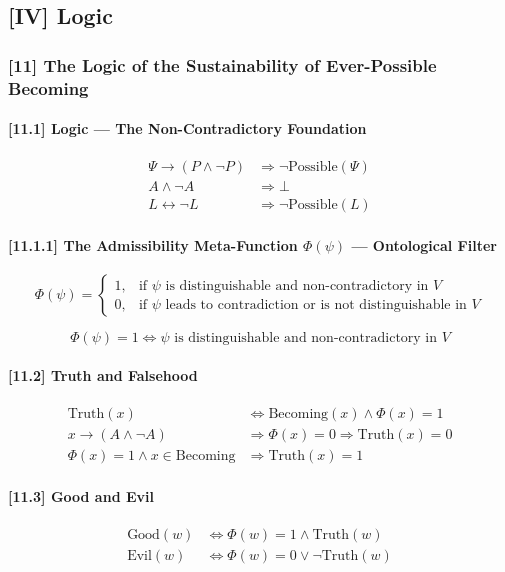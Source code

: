 \documentclass[12pt]{article}
\begin{document}
\subsection*{[IV] Logic}

\subsubsection*{[11] The Logic of the Sustainability of Ever-Possible Becoming}

\paragraph{[11.1] Logic — The Non-Contradictory Foundation}
\begin{align*}
\Psi \to (P \land \neg P) &\Rightarrow \neg\mathrm{Possible}(\Psi) \\
A \land \neg A &\Rightarrow \bot \\
L \leftrightarrow \neg L &\Rightarrow \neg\mathrm{Possible}(L)
\end{align*}

\paragraph{[11.1.1] The Admissibility Meta-Function $\Phi(\psi)$ — Ontological Filter}
\[
\Phi(\psi) =
\begin{cases}
1, & \text{if } \psi \text{ is distinguishable and non-contradictory in } V \\[4pt]
0, & \text{if } \psi \text{ leads to contradiction or is not distinguishable in } V
\end{cases}
\]

\[
\Phi(\psi) = 1 \iff \psi \text{ is distinguishable and non-contradictory in } V
\]

\paragraph{[11.2] Truth and Falsehood}
\begin{align*}
\text{Truth}(x) &\iff \text{Becoming}(x) \land \Phi(x) = 1 \\
x \rightarrow (A \land \neg A) &\Rightarrow \Phi(x) = 0 \Rightarrow \text{Truth}(x) = 0 \\
\Phi(x) = 1 \land x \in \text{Becoming} &\Rightarrow \text{Truth}(x) = 1
\end{align*}

\paragraph{[11.3] Good and Evil}
\begin{align*}
\text{Good}(w) &\iff \Phi(w) = 1 \land \text{Truth}(w) \\
\text{Evil}(w) &\iff \Phi(w) = 0 \lor \neg \text{Truth}(w)
\end{align*}
\end{document}
